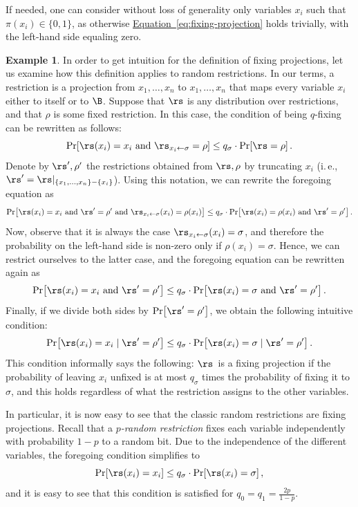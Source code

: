 \documentclass[11pt]{article}
\numberwithin{equation}{section}
\theoremstyle{definition}
\newtheorem{example}[theorem]{Example}
\theoremstyle{plain}
\newcommand{\ie}{i.\,e.}
\newcommand{\expref}[2]{\hyperref[#2]{#1~\ref{#2}}}
\theoremstyle{definition}\newtheorem{notation}[theorem]{Notation}\theoremstyle{plain}
\begin{document}
If needed, one can consider without loss of generality only variables
$x_{i}$ such that $\pi(x_{i})\in\{0,1\}$, as otherwise \expref{Equation}{eq:fixing-projection}
holds trivially, with the left-hand side equaling zero.
\begin{example}
In order to get intuition for the definition of fixing projections,
let us examine how this definition applies to random restrictions.
In our terms, a restriction is a projection from $x_{1},\ldots,x_{n}$
to $x_{1},\ldots,x_{n}$ that maps every variable $x_{i}$ either
to itself or to $\B$. Suppose that $\rs$ is any distribution over
restrictions, and that $\rho$ is some fixed restriction. In this
case, the condition of being $q$-fixing can be rewritten as follows:
\[
\Pr\!\left[\rs(x_{i})=x_{i}\text{ and }\rs_{x_{i}\gets\sigma}=\rho\right]\le q_{\sigma}\cdot\Pr\!\left[\rs=\rho\right].
\]
Denote by $\rs',\rho'$ the restrictions obtained from $\rs,\rho$
by truncating $x_{i}$ (\ie, $\rs'=\rs|_{\left\{ x_{1},\ldots,x_{n}\right\} -\left\{ x_{i}\right\} }$).
Using this notation, we can rewrite the foregoing equation as 
\[
\Pr\!\left[\rs(x_{i})=x_{i}\text{ and }\rs'=\rho'\text{ and }\rs_{x_{i}\gets\sigma}(x_{i})=\rho(x_{i})\right]\le q_{\sigma}\cdot\Pr\!\left[\rs(x_{i})=\rho(x_{i})\text{ and }\rs'=\rho'\right].
\]
Now, observe that it is always the case $\rs_{x_{i}\gets\sigma}(x_{i})=\sigma$,
and therefore the probability on the left-hand side is non-zero only
if $\rho(x_{i})=\sigma$. Hence, we can restrict ourselves to the
latter case, and the foregoing equation can be rewritten again as
\[
\Pr\!\left[\rs(x_{i})=x_{i}\text{ and }\rs'=\rho'\right]\le q_{\sigma}\cdot\Pr\!\left[\rs(x_{i})=\sigma\text{ and }\rs'=\rho'\right].
\]
Finally, if we divide both sides by $\Pr\!\left[\rs'=\rho'\right]$,
we obtain the following intuitive condition: 
\[
\Pr\!\left[\rs(x_{i})=x_{i}\mid\rs'=\rho'\right]\le q_{\sigma}\cdot\Pr\!\left[\rs(x_{i})=\sigma\mid\rs'=\rho'\right].
\]
This condition informally says the following: $\rs$~is a fixing
projection if the probability of leaving $x_{i}$ unfixed is at most
$q_{\sigma}$ times the probability of fixing it to $\sigma$, and
this holds regardless of what the restriction assigns to the other
variables.

In particular, it is now easy to see that the classic random restrictions
are fixing projections. Recall that a $p$\emph{-random restriction}
fixes each variable independently with probability $1-p$ to a random
bit. Due to the independence of the different variables, the foregoing
condition simplifies to 
\[
\Pr\!\left[\rs(x_{i})=x_{i}\right]\le q_{\sigma}\cdot\Pr\!\left[\rs(x_{i})=\sigma\right],
\]
and it is easy to see that this condition is satisfied for $q_{0}=q_{1}=\frac{2p}{1-p}$. 
\end{example}
\end{document}
